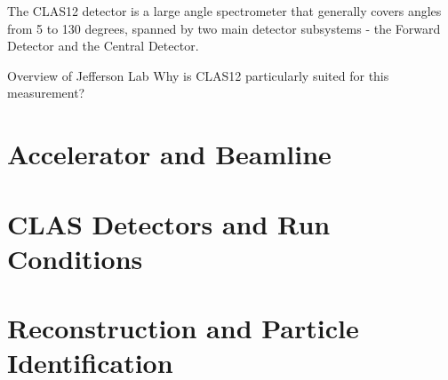    The CLAS12 detector is a large angle spectrometer that generally covers angles from 5 to 130 degrees, spanned by two main detector subsystems - the Forward Detector and the Central Detector.

    Overview of Jefferson Lab
    Why is CLAS12 particularly suited for this measurement?

\section{Accelerator and Beamline}
                  

\section{CLAS Detectors and Run Conditions}\label{sec:clas12exp}
    
    
    
\section{Reconstruction and Particle Identification}
    
    






